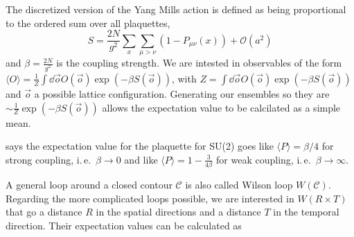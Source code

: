 \documentclass[%
 reprint,
 amsmath,amssymb,
 aps,
]{revtex4-1}
\renewcommand{\Re}{\operatorname{Re}}
\begin{document}
The discretized version of the Yang Mills action is defined as being proportional to the ordered sum over all plaquettes, \[S=\frac{2N}{g^2}\sum_{x}\sum_{\mu>\nu}\left(1-P_{\mu\nu}(x)\right)+\mathcal{O}(a^2)\]
and $\beta=\frac{2N}{g^2}$ is the coupling strength. We are intested in observables of the form $\langle O\rangle=\frac{1}{Z}\int \dd \vec{o} O(\vec{o}) \exp(-\beta S(\vec{o}))$, with $ Z=\int \dd \vec{o} O(\vec{o}) \exp(-\beta S(\vec{o}))$ and $\vec{o}$ a possible lattice configuration. Generating our ensembles so they are $\sim \frac{1}{Z} \exp(-\beta S(\vec{o}))$ allows the expectation value to be calcilated as a simple mean.

\citet{creutzsu2} says the expectation value for the plaquette for SU(2) goes like $\langle P \rangle=\beta/4$ for strong coupling, i.\,e.\, $\beta\to 0$ and like $\langle P \rangle =1-\frac{3}{4\beta}$ for weak coupling, i.\,e.\, $\beta\to \infty$.


%
%


A general loop around a closed contour $\mathcal{C}$ is also called Wilson loop $W(\mathcal{C})$. Regarding the more complicated loops possible, we are interested in $W(R\times T)$ that go a distance $R$ in the spatial directions and a distance $T$ in the temporal direction. Their expectation values can be calculated as 
\end{document}

